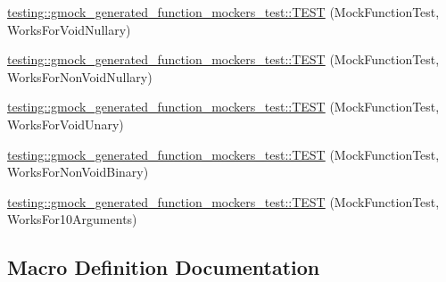 \begin{DoxyCompactItemize}
\item 
\hyperlink{namespacetesting_1_1gmock__generated__function__mockers__test_a8d67aadbc04fee7e2afc10ee91a76b74}{testing\+::gmock\+\_\+generated\+\_\+function\+\_\+mockers\+\_\+test\+::\+T\+E\+ST} (Mock\+Function\+Test, Works\+For\+Void\+Nullary)
\item 
\hyperlink{namespacetesting_1_1gmock__generated__function__mockers__test_a90817999d7f25ecf280453efb157db84}{testing\+::gmock\+\_\+generated\+\_\+function\+\_\+mockers\+\_\+test\+::\+T\+E\+ST} (Mock\+Function\+Test, Works\+For\+Non\+Void\+Nullary)
\item 
\hyperlink{namespacetesting_1_1gmock__generated__function__mockers__test_ab0e1ede6a1f6ef1774e27f5793a33599}{testing\+::gmock\+\_\+generated\+\_\+function\+\_\+mockers\+\_\+test\+::\+T\+E\+ST} (Mock\+Function\+Test, Works\+For\+Void\+Unary)
\item 
\hyperlink{namespacetesting_1_1gmock__generated__function__mockers__test_ab6337da98bc6bc97100ab177386f3b2b}{testing\+::gmock\+\_\+generated\+\_\+function\+\_\+mockers\+\_\+test\+::\+T\+E\+ST} (Mock\+Function\+Test, Works\+For\+Non\+Void\+Binary)
\item 
\hyperlink{namespacetesting_1_1gmock__generated__function__mockers__test_aa92f0b2b98d76f2c881103a19bed7ba6}{testing\+::gmock\+\_\+generated\+\_\+function\+\_\+mockers\+\_\+test\+::\+T\+E\+ST} (Mock\+Function\+Test, Works\+For10\+Arguments)
\end{DoxyCompactItemize}


\subsection{Macro Definition Documentation}
\mbox{\label{gmock-generated-function-mockers__test_8cc_af5ea000ce48c75251a5542898a872339}} 
